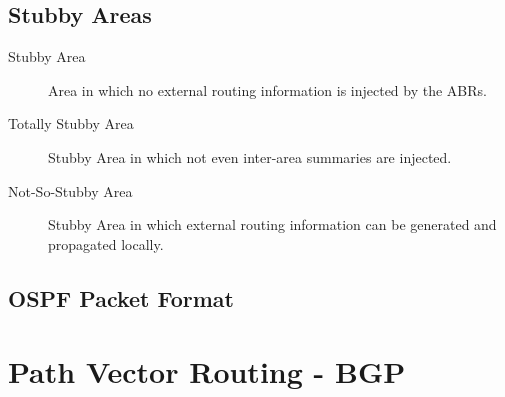 \documentclass{article}
\begin{document}
\subsection{Stubby Areas}
	
\begin{description}
	\item[Stubby Area] Area in which no external routing information is injected by the ABRs.
	\item[Totally Stubby Area] Stubby Area in which not even inter-area summaries are injected.
	\item[Not-So-Stubby Area]  Stubby Area in which external routing information can be generated and propagated locally.
\end{description}



\subsection{OSPF Packet Format}
	






\newpage

\section{Path Vector Routing - BGP}





	
\newpage


\printbibliography
\end{document}

